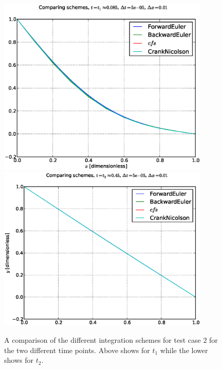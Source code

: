 \begin{figure}[htbp]
    \centering
    \includegraphics[width=0.9\textwidth]{plots/schemes_case2_t1.eps}
    \includegraphics[width=0.9\textwidth]{plots/schemes_case2_t2.eps}
    \caption{A comparison of the different integration schemes for
    test case 2 for the two different time points. Above shows for
    $t_1$ while the lower shows for $t_2$.}
    \label{fig:case2}
\end{figure}

